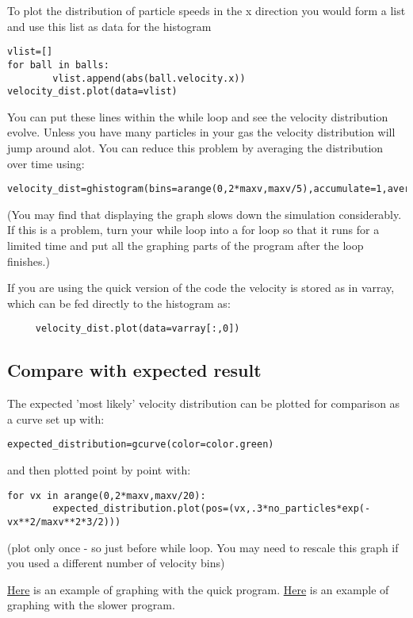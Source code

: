 \documentclass[a4paper]{letter}
\begin{document}
To plot the distribution of particle speeds in the x direction you would form a list and use 
this list as data for the histogram
{\color{code}\begin{verbatim}
vlist=[]
for ball in balls:
        vlist.append(abs(ball.velocity.x))
velocity_dist.plot(data=vlist)
\end{verbatim}}
You can put these lines within the while loop and see the velocity distribution evolve. 
Unless you have many particles in your gas the velocity distribution will jump around alot. 
You can reduce this problem by averaging the distribution over time using:
{\color{code}\begin{verbatim}
velocity_dist=ghistogram(bins=arange(0,2*maxv,maxv/5),accumulate=1,average=1)
\end{verbatim}}
(You may find that displaying the graph slows down the simulation considerably. 
If this is a problem, turn your while loop into a for loop so that it runs for a limited time 
and put all the graphing parts of the program after the loop finishes.)

If you are using the quick version of the code the velocity is stored as in varray, 
which can be fed directly to the histogram as:
{\color{code}\begin{verbatim}
     velocity_dist.plot(data=varray[:,0])
\end{verbatim}}
\subsection{Compare with expected result}
The expected 'most likely' velocity distribution can be plotted for comparison as a curve set 
up with:
{\color{code}\begin{verbatim}
expected_distribution=gcurve(color=color.green)
\end{verbatim}}
and then plotted point by point with:
{\color{code}\begin{verbatim}
for vx in arange(0,2*maxv,maxv/20):
        expected_distribution.plot(pos=(vx,.3*no_particles*exp(-vx**2/maxv**2*3/2)))
\end{verbatim}}
(plot only once - so just before while loop. You may need to rescale this graph if you 
used a different number of velocity bins)

\href{quickbouncevdist.html}{Here} is an example of graphing with the quick program.
\href{manybouncevdist.html}{Here} is an example of graphing with the slower program.
\end{document}
